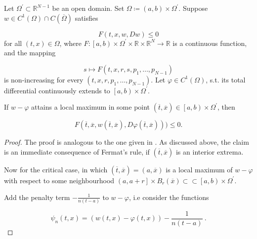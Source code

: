 \begin{lemma}
			\label{extension lemma}
			Let $ \Omega^{\prime} \subset \mathbb{R}^{N-1} $ be an open domain. Set $ \Omega \coloneqq \left( a, b \right) \times \Omega^{\prime} $. Suppose $ w \in C^{1}\left( \Omega \right) \cap C (\overline{\Omega})$ satisfies
			
			\begin{equation*}
				F(t, x, w, Dw) \leq 0
			\end{equation*}
			for all $ (t, x) \in \Omega $, where $ F : \left[ a, b \right) \times \Omega^{\prime} \times \mathbb{R} \times \mathbb{R}^{N} \to \mathbb{R} $ is a continuous function, and the mapping
			
			\begin{equation*}
				 s \mapsto F(t, x, r, s, p_1, \ldots, p_{N-1})
			\end{equation*}
			is non-increasing for every $ (t, x, r, p_1, \ldots, p_{N-1}) $. Let $ \varphi \in C^{1} \left( \Omega \right) $, s.t. its total differential continuously extends to $ \left[a, b\right) \times \Omega^{\prime} $.
			
			If $ w - \varphi $ attains a local maximum in some point $ (\overline{t}, \overline{x}) \in \left[a, b\right) \times \Omega^{\prime} $, then
			
			\begin{equation*}
				F(\overline{t}, \overline{x}, w(\overline{t}, \overline{x}), D\varphi(\overline{t}, \overline{x}))) \leq 0.
			\end{equation*}
			
			\begin{proof}
				The proof is analogous to the one given in \cite[p.~41]{bardi2008optimal}. As discussed above, the claim is an immediate consequence of Fermat's rule, if $ (\overline{t}, \overline{x}) $ is an interior extrema.
				
				Now for the critical case, in which $ (\overline{t}, \overline{x}) = (a, \overline{x}) $ is a local maximum of $ w - \varphi $ with respect to some neighbourhood $ \left( a, a + r \right] \times B_r(\overline{x}) \subset \subset \left[ a, b \right) \times \Omega^{\prime} $. 
				
				Add the penalty term $ - \frac{1}{n(t-a)} $ to $ w - \varphi $, i.e consider the functions
				
				\begin{equation*}
					\psi_n(t, x) = ( w(t, x) - \varphi(t, x)) - \frac{1}{n(t-a)} \ .
				\end{equation*}
				

\end{proof}
\end{lemma}
